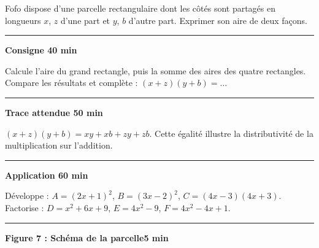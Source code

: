 \documentclass[10pt,a4paper]{article}
\begin{document}
Fofo dispose d'une parcelle rectangulaire dont les côtés sont partagés en longueurs $x$, $z$ d'une part et $y$, $b$ d'autre part. Exprimer son aire de deux façons.\par
\par\smallskip\hrule\smallskip
\textbf{Consigne 4}\hfill \textbf{0 min}\par
Calcule l'aire du grand rectangle, puis la somme des aires des quatre rectangles. Compare les résultats et complète : $(x+z)(y+b)=\ldots$\par
\par\smallskip\hrule\smallskip
\textbf{Trace attendue 5}\hfill \textbf{0 min}\par
$(x+z)(y+b)=xy+xb+zy+zb$. Cette égalité illustre la distributivité de la multiplication sur l'addition.\par
\par\smallskip\hrule\smallskip
\textbf{Application 6}\hfill \textbf{0 min}\par
Développe : $A=(2x+1)^2$, $B=(3x-2)^2$, $C=(4x-3)(4x+3)$. Factorise : $D=x^2+6x+9$, $E=4x^2-9$, $F=4x^2-4x+1$.\par
\par\smallskip\hrule\smallskip
\textbf{Figure 7 : Schéma de la parcelle}\hfill \textbf{5 min}\par
{}\par
\end{document}
